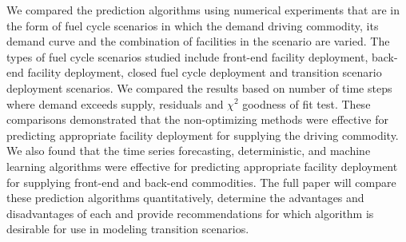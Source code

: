 \documentclass{anstrans}
\begin{document}
We compared the prediction algorithms using numerical experiments that are 
in the form of fuel cycle scenarios in which the
demand driving commodity, its demand curve and the combination of facilities 
in the scenario are varied. 
The types of fuel cycle scenarios studied include front-end facility deployment, 
back-end facility deployment, closed fuel cycle deployment and transition 
scenario deployment scenarios.
We compared the results based on number of time
steps where demand exceeds supply, residuals and $\chi^2$ goodness of fit test.
These comparisons demonstrated that the non-optimizing methods
were effective for predicting 
appropriate facility deployment for supplying the driving commodity.  
We also found that the time series forecasting, deterministic,
and machine learning 
algorithms were effective for predicting appropriate facility deployment for 
supplying front-end and back-end commodities. The full paper will compare 
these prediction algorithms quantitatively, determine the advantages and 
disadvantages of each and provide recommendations for which algorithm is 
desirable for use in modeling transition scenarios. 



\end{document}

